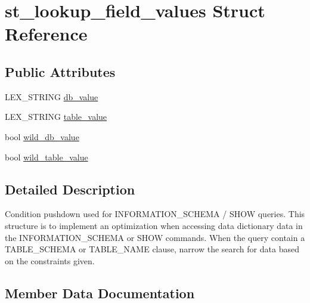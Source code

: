 \hypertarget{structst__lookup__field__values}{}\section{st\+\_\+lookup\+\_\+field\+\_\+values Struct Reference}
\label{structst__lookup__field__values}
\subsection*{Public Attributes}
\begin{DoxyCompactItemize}
\item 
L\+E\+X\+\_\+\+S\+T\+R\+I\+NG \mbox{\hyperlink{structst__lookup__field__values_aa31bf13e12e3f30c7e07f78439cb6e56}{db\+\_\+value}}
\item 
L\+E\+X\+\_\+\+S\+T\+R\+I\+NG \mbox{\hyperlink{structst__lookup__field__values_a5ae61210774960f96b7da5bd6094bacf}{table\+\_\+value}}
\item 
bool \mbox{\hyperlink{structst__lookup__field__values_a696c94dd58f32374162948c5c97ddb02}{wild\+\_\+db\+\_\+value}}
\item 
bool \mbox{\hyperlink{structst__lookup__field__values_afc672c52a3286578c0edaee5676cf7fb}{wild\+\_\+table\+\_\+value}}
\end{DoxyCompactItemize}


\subsection{Detailed Description}
Condition pushdown used for I\+N\+F\+O\+R\+M\+A\+T\+I\+O\+N\+\_\+\+S\+C\+H\+E\+MA / S\+H\+OW queries. This structure is to implement an optimization when accessing data dictionary data in the I\+N\+F\+O\+R\+M\+A\+T\+I\+O\+N\+\_\+\+S\+C\+H\+E\+MA or S\+H\+OW commands. When the query contain a T\+A\+B\+L\+E\+\_\+\+S\+C\+H\+E\+MA or T\+A\+B\+L\+E\+\_\+\+N\+A\+ME clause, narrow the search for data based on the constraints given. 

\subsection{Member Data Documentation}
\mbox{\label{structst__lookup__field__values_aa31bf13e12e3f30c7e07f78439cb6e56}} 
